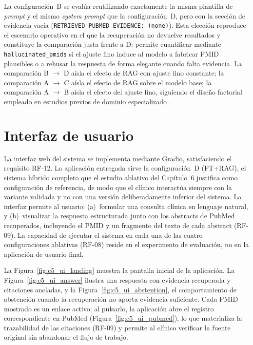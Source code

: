 \documentclass[11pt,a4paper,spanish]{book}
\numberwithin{equation}{chapter}
\numberwithin{figure}{chapter}
\begin{document}
La configuración~B se evalúa reutilizando exactamente la misma plantilla de \textit{prompt} y el mismo \textit{system prompt} que la configuración~D, pero con la sección de evidencia vacía (\texttt{RETRIEVED PUBMED EVIDENCE: (none)}). Esta elección reproduce el escenario operativo en el que la recuperación no devuelve resultados y constituye la comparación justa frente a D: permite cuantificar mediante \texttt{hallucinated\_pmids} si el ajuste fino induce al modelo a fabricar PMID plausibles o a rehusar la respuesta de forma elegante cuando falta evidencia. La comparación B $\to$ D aísla el efecto de RAG con ajuste fino constante; la comparación A $\to$ C aísla el efecto de RAG sobre el modelo base; la comparación A $\to$ B aísla el efecto del ajuste fino, siguiendo el diseño factorial empleado en estudios previos de dominio especializado \cite{balaguer2024ragvsfinetuningpipelines, pingua_medical_FT_vs_RAG_2025, bioengineering13020225}.

\section{Interfaz de usuario}
\label{sec:c5_ui}

La interfaz web del sistema se implementa mediante Gradio, satisfaciendo el requisito RF-12. La aplicación entregada sirve la configuración~D (FT+RAG), el sistema híbrido completo que el estudio ablativo del Capítulo~6 justifica como configuración de referencia, de modo que el clínico interactúa siempre con la variante validada y no con una versión deliberadamente inferior del sistema. La interfaz permite al usuario: (a)~formular una consulta clínica en lenguaje natural, y (b)~visualizar la respuesta estructurada junto con los abstracts de PubMed recuperados, incluyendo el PMID y un fragmento del texto de cada abstract (RF-09). La capacidad de ejecutar el sistema en cada una de las cuatro configuraciones ablativas (RF-08) reside en el experimento de evaluación, no en la aplicación de usuario final.

La Figura~\ref{fig:c5_ui_landing} muestra la pantalla inicial de la aplicación. La Figura~\ref{fig:c5_ui_answer} ilustra una respuesta con evidencia recuperada y citaciones ancladas, y la Figura~\ref{fig:c5_ui_abstention}, el comportamiento de abstención cuando la recuperación no aporta evidencia suficiente. Cada PMID mostrado es un enlace activo: al pulsarlo, la aplicación abre el registro correspondiente en PubMed (Figura~\ref{fig:c5_ui_pubmed}), lo que materializa la trazabilidad de las citaciones (RF-09) y permite al clínico verificar la fuente original sin abandonar el flujo de trabajo.
\end{document}
